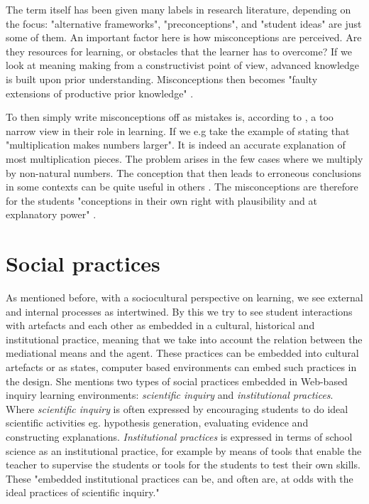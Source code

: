 The term itself has been given many labels in research literature, depending on the focus: "alternative frameworks", "preconceptions", and "student ideas" are just some of them. An important factor here is how misconceptions are perceived. Are they resources for learning, or obstacles that the learner has to overcome? If we look at meaning making from a constructivist point of view, advanced knowledge is built upon prior understanding. Misconceptions then becomes "faulty extensions of productive prior knowledge" \citep{smith1994misconceptions}.

To then simply write misconceptions off as mistakes is, according to \citet{smith1994misconceptions}, a too narrow view in their role in learning. If we e.g take the example of stating that "multiplication makes numbers larger". It is indeed an accurate explanation of most multiplication pieces. The problem arises in the few cases where we multiply by non-natural numbers. The conception that then leads to erroneous conclusions in some contexts can be quite useful in others \citep{smith1994misconceptions}. The misconceptions are therefore for the students "conceptions in their own right with plausibility and at explanatory power" \citetext{Smith, diSessa \& Roschelle 1993, referenced in \citealp{larkin2012misconceptions}}. 

\section{Social practices}
As mentioned before, with a sociocultural perspective on learning, we see external and internal processes as intertwined. By this we try to see student interactions with artefacts and each other as embedded in a cultural, historical and institutional practice, meaning that we take into account the relation between the mediational means and the agent. These practices can be embedded into cultural artefacts or as \citet{furberg2009socio} states, computer based environments can embed such practices in the design. She mentions two types of social practices embedded in Web-based inquiry learning environments: \emph{scientific inquiry} and \emph{institutional practices}.  Where \emph{scientific inquiry} is often expressed by encouraging students to do ideal scientific activities eg. hypothesis generation, evaluating evidence and constructing explanations. \emph{Institutional practices} is expressed in terms of school science as an institutional practice, for example by means of tools that enable the teacher to supervise the students or tools for the students to test their own skills. These "embedded institutional practices can be, and often are, at odds with the ideal practices of scientific inquiry." \citetext{Cinn \& Malhotra 2002, referenced in \citealp{furberg2009socio}} 

